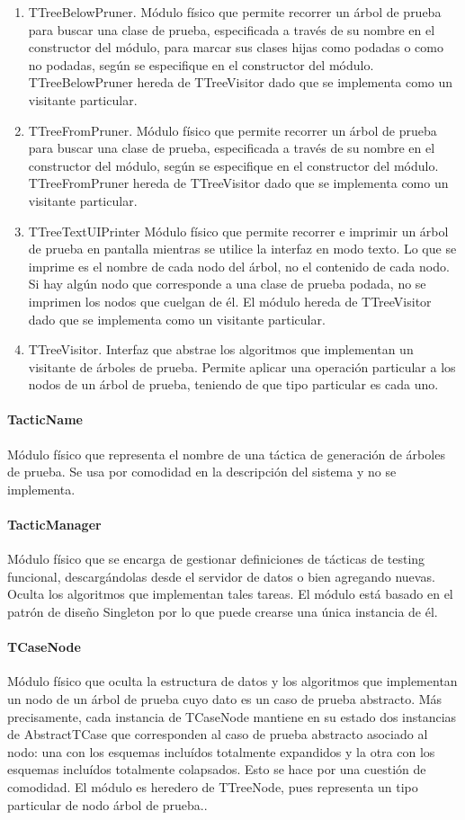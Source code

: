 \documentclass[a4paper,10pt]{report}
\begin{document}
\begin{enumerate}
						\item{TTreeBelowPruner. Módulo físico que permite recorrer un árbol de prueba para buscar una clase de prueba, especificada a través de su nombre en el constructor del módulo, para marcar sus clases hijas como podadas o como no podadas, según se especifique en el constructor del módulo. TTreeBelowPruner hereda de TTreeVisitor dado que se implementa como un visitante particular.}
						\item{TTreeFromPruner. Módulo físico que permite recorrer un árbol de prueba para buscar una clase de prueba, especificada a través de su nombre en el constructor del módulo, según se especifique en el constructor del módulo. TTreeFromPruner hereda de TTreeVisitor dado que se implementa como un visitante particular.}
						\item{TTreeTextUIPrinter} Módulo físico que permite recorrer e imprimir un árbol de prueba en pantalla mientras se utilice la interfaz en modo texto. Lo que se imprime es el nombre de cada nodo del árbol, no el contenido de cada nodo. Si hay algún nodo que corresponde a una clase de prueba podada, no se imprimen los nodos que cuelgan de él. El módulo hereda de TTreeVisitor dado que se implementa como un visitante particular.
						\item{TTreeVisitor. Interfaz que abstrae los algoritmos que implementan un visitante de árboles de prueba. Permite aplicar una operación particular a los nodos de un árbol de prueba, teniendo de que tipo particular es cada uno.}
					\end{enumerate}
				\paragraph{TacticName}
				Módulo físico que representa el nombre de una táctica de generación de árboles de prueba. Se usa por comodidad en la descripción del sistema y no se implementa.
				\paragraph{TacticManager}
				Módulo físico que se encarga de gestionar definiciones de tácticas de testing funcional, descargándolas desde el servidor de datos o bien agregando nuevas. Oculta los algoritmos que implementan tales tareas. El módulo está basado en el patrón de diseño Singleton por lo que puede crearse una única instancia de él. 
				\paragraph{TCaseNode}
				Módulo físico que oculta la estructura de datos y los algoritmos que implementan un nodo de un árbol de prueba cuyo dato es un caso de prueba abstracto. Más precisamente, cada instancia de TCaseNode mantiene en su estado dos instancias de AbstractTCase que corresponden al caso de prueba abstracto asociado al nodo: una con los esquemas incluídos totalmente expandidos y la otra con los esquemas incluídos totalmente colapsados. Esto se hace por una cuestión de comodidad. El módulo es heredero de TTreeNode, pues representa un tipo particular de nodo árbol de prueba..
\end{document}
